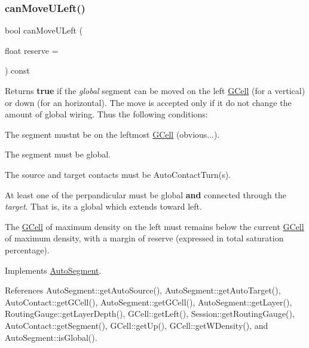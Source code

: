 \subsubsection{\texorpdfstring{can\+Move\+U\+Left()}{canMoveULeft()}}
{\footnotesize\ttfamily bool can\+Move\+U\+Left (\begin{DoxyParamCaption}\item[{float}]{reserve = {} }\end{DoxyParamCaption}) const\hspace{0.3cm}{\ttfamily [virtual]}}

\begin{DoxyReturn}{Returns}
{\bfseries true} if the {\itshape global} segment can be moved on the left \mbox{\hyperlink{classKatabatic_1_1GCell}{G\+Cell}} (for a vertical) or down (for an horizontal). The move is accepted only if it do not change the amount of global wiring. Thus the following conditions\+:
\begin{DoxyItemize}
\item The segment mustn\textquotesingle{}t be on the leftmost \mbox{\hyperlink{classKatabatic_1_1GCell}{G\+Cell}} (obvious...).
\item The segment must be global.
\item The source and target contacts must be Auto\+Contact\+Turn(s).
\item At least one of the perpandicular must be global {\bfseries and} connected through the {\itshape target}. That is, it\textquotesingle{}s a global which extends toward left.
\item The \mbox{\hyperlink{classKatabatic_1_1GCell}{G\+Cell}} of maximum density on the left must remains below the current \mbox{\hyperlink{classKatabatic_1_1GCell}{G\+Cell}} of maximum density, with a margin of {\ttfamily reserve} (expressed in total saturation percentage). 
\end{DoxyItemize}
\end{DoxyReturn}


Implements \mbox{\hyperlink{classKatabatic_1_1AutoSegment_aad55626c9d793a0b08bcff5be2a5ad0c}{Auto\+Segment}}.



References Auto\+Segment\+::get\+Auto\+Source(), Auto\+Segment\+::get\+Auto\+Target(), Auto\+Contact\+::get\+G\+Cell(), Auto\+Segment\+::get\+G\+Cell(), Auto\+Segment\+::get\+Layer(), Routing\+Gauge\+::get\+Layer\+Depth(), G\+Cell\+::get\+Left(), Session\+::get\+Routing\+Gauge(), Auto\+Contact\+::get\+Segment(), G\+Cell\+::get\+Up(), G\+Cell\+::get\+W\+Density(), and Auto\+Segment\+::is\+Global().


